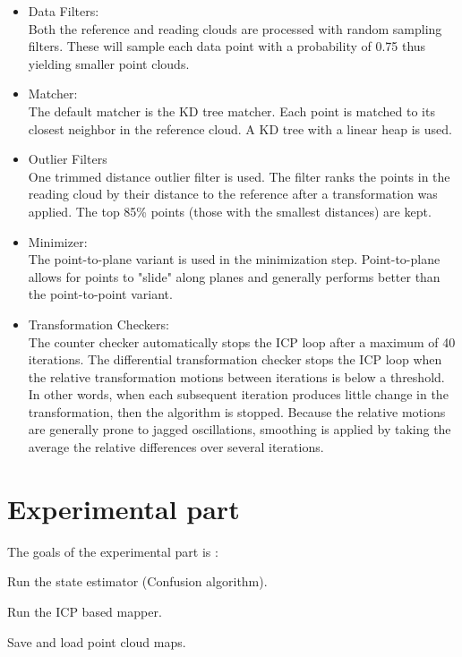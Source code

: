 \documentclass[a4paper,12pt]{article}
\begin{document}
\begin{itemize}
    \item Data Filters:\\
Both the reference and reading clouds are processed with random sampling filters. These will sample each data point with a probability of 0.75 thus yielding smaller point clouds.
\item Matcher:\\
The default matcher is the KD tree matcher. Each point is matched to its closest neighbor in the reference cloud. A KD tree with a linear heap is used.

\item Outlier Filters\\
One trimmed distance outlier filter is used. The filter ranks the points in the reading cloud by their distance to the reference after a transformation was applied. The top 85\% points (those with the smallest distances) are kept.

\item Minimizer:\\
The point-to-plane variant is used in the minimization step. Point-to-plane allows for points to "slide" along planes and generally performs better than the point-to-point variant.

\item Transformation Checkers:\\
The counter checker automatically stops the ICP loop after a maximum of 40 iterations. The differential transformation checker stops the ICP loop when the relative transformation motions between iterations is below a threshold. In other words, when each subsequent iteration produces little change in the transformation, then the algorithm is stopped. Because the relative motions are generally prone to jagged oscillations, smoothing is applied by taking the average the relative differences over several iterations.
\end{itemize}
\newpage
\section{Experimental part}
The goals of the experimental part is :
\begin{tighitemize}
    \item Run the state estimator (Confusion algorithm).
    \item Run the ICP based mapper.
    \item Save and load point cloud maps.
\end{tighitemize}
\end{document}

